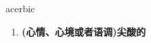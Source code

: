 
\begin{frame}
{\huge acerbic}
\begin{center}
\begin{enumerate}\Large
  \item \textbf{(心情、心境或者语调)尖酸的}
\end{enumerate}
\end{center}
\end{frame}
